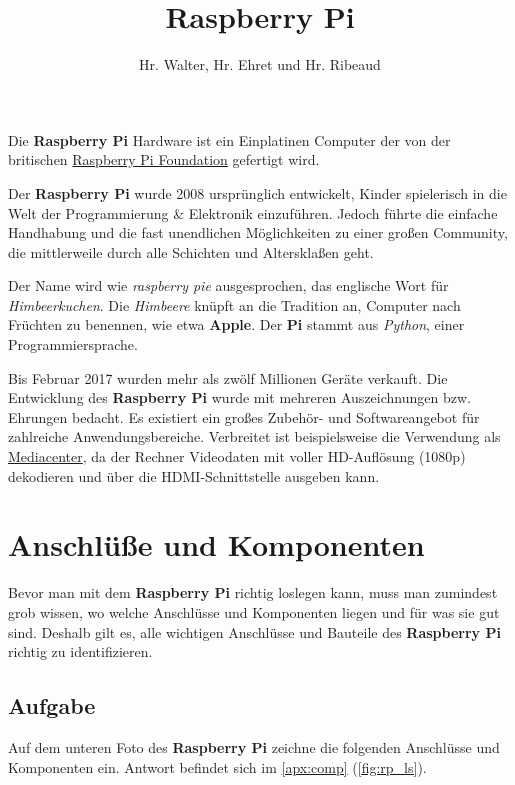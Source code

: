 \documentclass[12pt,a4paper]{article}
\newcommand{\rp}{\textbf{Raspberry Pi}\xspace}
\begin{document}
\title{Raspberry Pi}
\author{Hr. Walter, Hr. Ehret und Hr. Ribeaud}
\maketitle

Die \rp Hardware ist ein Einplatinen Computer der von der britischen \href{https://www.raspberrypi.org/}{Raspberry Pi Foundation} gefertigt wird.

Der \rp wurde 2008 ursprünglich entwickelt, Kinder spielerisch in die Welt der Programmierung \& Elektronik einzuführen. Jedoch führte die einfache Handhabung und die fast unendlichen Möglichkeiten zu einer großen Community, die mittlerweile durch alle Schichten und Altersklaßen geht.

Der Name wird wie \textit{raspberry pie} ausgesprochen, das englische Wort für \textit{Himbeerkuchen}. Die \textit{Himbeere} knüpft an die Tradition an, Computer nach Früchten zu benennen, wie etwa \textbf{Apple}. Der \textbf{Pi} stammt aus \textit{Python}, einer Programmiersprache.

Bis Februar 2017 wurden mehr als zwölf Millionen Geräte verkauft. Die Entwicklung des \rp wurde mit mehreren Auszeichnungen bzw. Ehrungen bedacht. Es existiert ein großes Zubehör- und Softwareangebot für zahlreiche Anwendungsbereiche. Verbreitet ist beispielsweise die Verwendung als \href{https://www.youtube.com/watch?v=YPu7oSVbMVo}{Mediacenter}, da der Rechner Videodaten mit voller HD-Auflösung (1080p) dekodieren und über die HDMI-Schnittstelle ausgeben kann. 

\section{Anschlüße und Komponenten}
\label{sec:comp}

Bevor man mit dem \rp richtig loslegen kann, muss man zumindest grob wissen, wo welche Anschlüsse und Komponenten liegen und für was sie gut sind. Deshalb gilt es, alle wichtigen Anschlüsse und Bauteile des \rp richtig zu identifizieren.

\subsection{Aufgabe}

Auf dem unteren Foto des \rp zeichne die folgenden Anschlüsse und Komponenten ein. Antwort befindet sich im \cref{apx:comp} (\cref{fig:rp_ls}).
\end{document}
